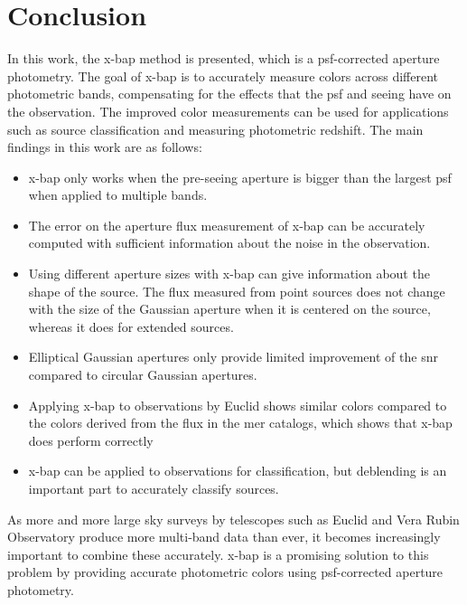 \chapter{Conclusion}

In this work, the \gls{x-bap} method is presented, which is a \gls{psf}-corrected aperture photometry. The goal of \gls{x-bap} is to accurately measure colors across different photometric bands, compensating for the effects that the \gls{psf} and seeing have on the observation. The improved color measurements can be used for applications such as source classification and measuring photometric redshift. The main findings in this work are as follows:
\begin{itemize}
    \item \gls{x-bap} only works when the pre-seeing aperture is bigger than the largest \gls{psf} when applied to multiple bands.
    \item The error on the aperture flux measurement of \gls{x-bap} can be accurately computed with sufficient information about the noise in the observation.
    \item Using different aperture sizes with \gls{x-bap} can give information about the shape of the source. The flux measured from point sources does not change with the size of the Gaussian aperture when it is centered on the source, whereas it does for extended sources.
    \item Elliptical Gaussian apertures only provide limited improvement of the \gls{snr} compared to circular Gaussian apertures.
    \item Applying \gls{x-bap} to observations by Euclid shows similar colors compared to the colors derived from the flux in the \gls{mer} catalogs, which shows that \gls{x-bap} does perform correctly
    \item \gls{x-bap} can be applied to observations for classification, but deblending is an important part to accurately classify sources.
\end{itemize}
As more and more large sky surveys by telescopes such as Euclid and Vera Rubin Observatory produce more multi-band data than ever, it becomes increasingly important to combine these accurately. \gls{x-bap} is a promising solution to this problem by providing accurate photometric colors using \gls{psf}-corrected aperture photometry.
